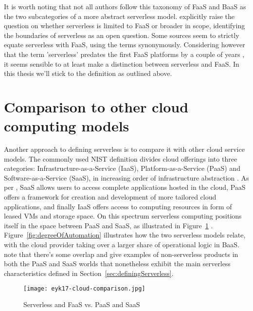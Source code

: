 It is worth noting that not all authors follow this taxonomy of FaaS and BaaS as the two subcategories of a more abstract serverless model. \textcite{baldini17currentTrends} explicitly raise the question on whether serverless is limited to FaaS or broader in scope, identifying the boundaries of serverless as an open question. Some sources \parencite[][among others]{hendrickson16openlambda,mcgrath17implement,varghese18next} seem to strictly equate serverless with FaaS, using the terms synonymously. Considering however that the term 'serverless' predates the first FaaS platforms by a couple of years \parencite{robert2016serverlessarchitectures}, it seems sensible to at least make a distinction between serverless and FaaS. In this thesis we'll stick to the \textcite{cncf18serverlessWG} definition as outlined above.

\section{Comparison to other cloud computing models} \label{sec:comparisonCloud}

Another approach to defining serverless is to compare it with other cloud service models. The commonly used NIST definition divides cloud offerings into three categories: Infrastructure-as-a-Service (IaaS), Platform-as-a-Service (PaaS) and Software-as-a-Service (SaaS), in increasing order of infrastructure abstraction \parencite{nist11definitions}. As per \textcite{buyya2017manifesto}, SaaS allows users to access complete applications hosted in the cloud, PaaS offers a framework for creation and development of more tailored cloud applications, and finally IaaS offers access to computing resources in form of leased VMs and storage space. On this spectrum serverless computing positions itself in the space between PaaS and SaaS, as illustrated in Figure~\ref{fig:cloudSpectrum} \parencite{van2017spec}. Figure~\ref{fig:degreeOfAutomation} illustrates how the two serverless models relate, with the cloud provider taking over a larger share of operational logic in BaaS. \textcite{van2017spec} note that there's some overlap and give examples of non-serverless products in both the PaaS and SaaS worlds that nonetheless exhibit the main serverless characteristics defined in Section~\ref{sec:definingServerless}.

\begin{figure}[h]
  \centering
  \texttt{[image: eyk17-cloud-comparison.jpg]}
  \caption{Serverless and FaaS vs. PaaS and SaaS \parencite{van2017spec}}
  \label{fig:cloudSpectrum}
\end{figure}

